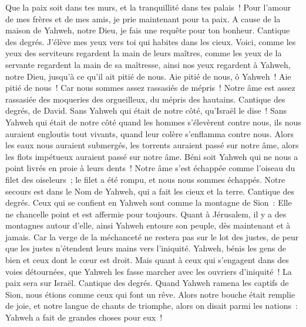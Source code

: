 \begin{multicols}{2}
Que la paix soit dans tes murs, et la tranquillité dans tes palais~!
Pour l'amour de mes frères et de mes amis, je prie maintenant pour ta paix.
A cause de la maison de Yahweh, notre Dieu, je fais une requête pour ton bonheur.
\VerseOne{}Cantique des degrés. J'élève mes yeux vers toi qui habites dans les cieux.
Voici, comme les yeux des serviteurs regardent la main de leurs maîtres, comme les yeux de la servante regardent la main de sa maîtresse, ainsi nos yeux regardent à Yahweh, notre Dieu, jusqu'à ce qu'il ait pitié de nous.
Aie pitié de nous, ô Yahweh~! Aie pitié de nous~! Car nous sommes assez rassasiés de mépris~!
Notre âme est assez rassasiée des moqueries des orgueilleux, du mépris des hautains.
\VerseOne{}Cantique des degrés, de David. Sans Yahweh qui était de notre côté, qu'Israël le dise~!
Sans Yahweh qui était de notre côté quand les hommes s'élevèrent contre nous,
ils nous auraient engloutis tout vivants, quand leur colère s'enflamma contre nous.
Alors les eaux nous auraient submergés, les torrents auraient passé sur notre âme,
alors les flots impétueux auraient passé sur notre âme.
Béni soit Yahweh qui ne nous a point livrés en proie à leurs dents~!
Notre âme s'est échappée comme l'oiseau du filet des oiseleurs~; le filet a été rompu, et nous nous sommes échappés.
Notre secours est dans le Nom de Yahweh, qui a fait les cieux et la terre.
\VerseOne{}Cantique des degrés. Ceux qui se confient en Yahweh sont comme la montagne de Sion~: Elle ne chancelle point et est affermie pour toujours.
Quant à Jérusalem, il y a des montagnes autour d'elle, ainsi Yahweh entoure son peuple, dès maintenant et à jamais.
Car la verge de la méchanceté ne restera pas sur le lot des justes, de peur que les justes n'étendent leurs mains vers l'iniquité.
Yahweh, bénis les gens de bien et ceux dont le cœur est droit.
Mais quant à ceux qui s'engagent dans des voies détournées, que Yahweh les fasse marcher avec les ouvriers d'iniquité~! La paix sera sur Israël.
\VerseOne{}Cantique des degrés. Quand Yahweh ramena les captifs de Sion, nous étions comme ceux qui font un rêve.
Alors notre bouche était remplie de joie, et notre langue de chants de triomphe, alors on disait parmi les nations~: Yahweh a fait de grandes choses pour eux~!

\end{multicols}
